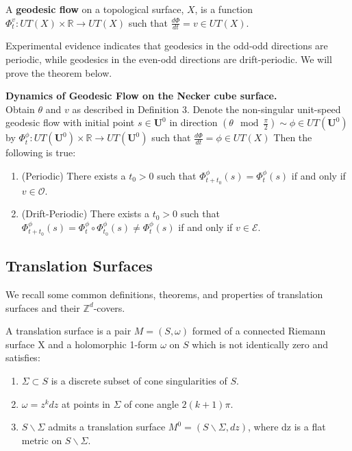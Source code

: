 \documentclass[]{article}
\begin{document}
\begin{Def}
A \textbf{geodesic flow} on a topological surface, $X$, is a function $\Phi^{v}_t:UT(X)\times\mathbb{R}\rightarrow UT(X)$ such that $\frac{d\Phi}{dt}=v\in UT(X)$. 
\end{Def}

\noindent Experimental evidence indicates that geodesics in the odd-odd directions are periodic, while geodesics in the even-odd directions are drift-periodic. We will prove the theorem below.

\begin{thm}{\textbf{Dynamics of Geodesic Flow on the Necker cube surface.}}\\ Obtain $\theta$ and $v$ as described in Definition 3. Denote the non-singular unit-speed geodesic flow with initial point $s\in\mathbf{U}^0$ in direction $(\theta\mod{\frac{\pi}{2}})\sim\phi\in UT(\mathbf{U}^0)$ by $\Phi^{\phi}_t:UT(\mathbf{U}^0)\times\mathbb{R}\rightarrow UT(\mathbf{U}^0)$ such that $\frac{d\Phi}{dt}=\phi\in UT(X)$  Then the following is true:
\begin{enumerate}[label=(\roman*)]
\item (Periodic) There exists a $t_0 > 0$ such that $\Phi^{\phi}_{t+t_{0}}(s)=\Phi^{\phi}_{t}(s)$ if and only if $v\in\mathcal{O}$.
\item (Drift-Periodic) There exists a $t_0 > 0$ such that $\Phi^{\phi}_{t+t_{0}}(s)= \Phi^{\phi}_{t}\circ\Phi^{\phi}_{t_0}(s)\neq\Phi^{\phi}_t(s)$ if and only if $v\in\mathcal{E}$.
\end{enumerate}
\end{thm}

\subsection{Translation Surfaces}
We recall some common definitions, theorems, and properties of translation surfaces and their $\mathbb{Z}^d$-covers.


\begin{Def}
A translation surface is a pair $M=(S,\omega)$ formed of a connected
Riemann surface X and a holomorphic 1-form $\omega$ on $S$ which is not identically zero and satisfies:
\begin{enumerate}
\item $\Sigma\subset S$ is a discrete subset of cone singularities of $S$.
\item $\omega=z^kdz$ at points in $\Sigma$ of cone angle $2(k+1)\pi$.
\item $S\backslash\Sigma$ admits a translation surface $M^0=(S\backslash\Sigma,dz)$, where dz is a flat metric on $S\backslash\Sigma$.
\end{enumerate}
\end{Def}
\end{document}
